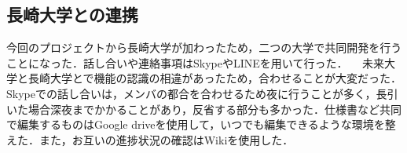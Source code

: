 \subsection{長崎大学との連携}
 今回のプロジェクトから長崎大学が加わったため，二つの大学で共同開発を行うことになった．話し合いや連絡事項はSkypeやLINEを用いて行った．
　未来大学と長崎大学とで機能の認識の相違があったため，合わせることが大変だった．Skypeでの話し合いは，メンバの都合を合わせるため夜に行うことが多く，長引いた場合深夜までかかることがあり，反省する部分も多かった．仕様書など共同で編集するものはGoogle driveを使用して，いつでも編集できるような環境を整えた．また，お互いの進捗状況の確認はWikiを使用した．
